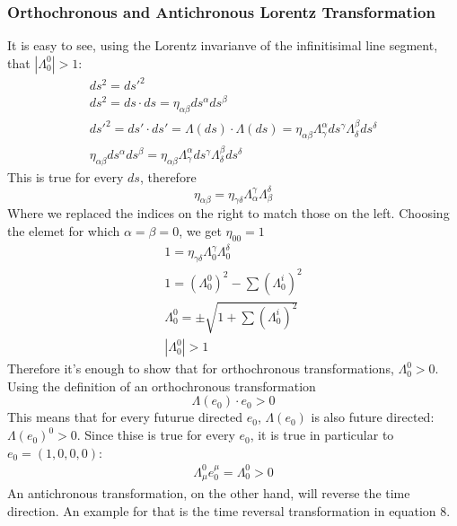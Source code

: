 \documentclass{article}
\begin{document}
\subsubsection{Orthochronous and Antichronous Lorentz Transformation}
It is easy to see, using the Lorentz invarianve of the infinitisimal line segment, that $\left|\Lambda^0_0\right| > 1$:
\begin{equation}
\begin{gathered}
    ds^2 = ds'^2 \\
    ds^2 = ds \cdot ds = \eta_{\alpha\beta} ds^\alpha ds^\beta \\
    ds'^2 = ds' \cdot ds' = \Lambda(ds) \cdot \Lambda(ds) = \eta_{\alpha\beta} \Lambda^\alpha_\gamma ds^\gamma \Lambda^\beta_\delta ds^\delta \\
    \eta_{\alpha\beta} ds^\alpha ds^\beta = \eta_{\alpha\beta} \Lambda^\alpha_\gamma ds^\gamma \Lambda^\beta_\delta ds^\delta
\end{gathered}
\end{equation}
This is true for every $ds$, therefore 
\begin{equation}
    \eta_{\alpha\beta} = \eta_{\gamma\delta} \Lambda_\alpha^\gamma \Lambda_\beta^\delta
\end{equation}
Where we replaced the indices on the right to match those on the left. Choosing the elemet for which $\alpha = \beta = 0$, we get $\eta_{00} = 1$
\begin{equation}
\begin{gathered}
    1 = \eta_{\gamma\delta} \Lambda_0^\gamma \Lambda_0^\delta \\
    1 = (\Lambda^0_0)^2 - \sum (\Lambda_0^i)^2 \\
    \Lambda^0_0 = \pm\sqrt{1 + \sum (\Lambda_0^i)^2} \\
    \left|\Lambda^0_0\right| > 1
\end{gathered}
\end{equation}
Therefore it's enough to show that for orthochronous transformations, $\Lambda^0_0 > 0$. Using the definition of an orthochronous transformation
\begin{equation}
    \Lambda(e_0)\cdot e_0 > 0
\end{equation}
This means that for every futurue directed $e_0$, $\Lambda(e_0)$ is also future directed: $\Lambda(e_0)^0 > 0$. Since thise is true for every $e_0$, it is true in particular to $e_0 = (1, 0, 0, 0)$:
\begin{equation}
\begin{gathered}
    \Lambda^0_\mu e_0^\mu = \Lambda^0_0 > 0
\end{gathered}
\end{equation}
An antichronous transformation, on the other hand, will reverse the time direction. An example for that is the time reversal transformation in equation 8.
\end{document}
